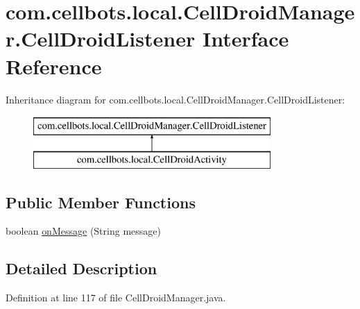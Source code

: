 \hypertarget{interfacecom_1_1cellbots_1_1local_1_1_cell_droid_manager_1_1_cell_droid_listener}{\section{com.\-cellbots.\-local.\-Cell\-Droid\-Manager.\-Cell\-Droid\-Listener Interface Reference}
\label{interfacecom_1_1cellbots_1_1local_1_1_cell_droid_manager_1_1_cell_droid_listener}
}
Inheritance diagram for com.\-cellbots.\-local.\-Cell\-Droid\-Manager.\-Cell\-Droid\-Listener\-:\begin{figure}[H]
\begin{center}
\leavevmode
\includegraphics[height=2.000000cm]{interfacecom_1_1cellbots_1_1local_1_1_cell_droid_manager_1_1_cell_droid_listener}
\end{center}
\end{figure}
\subsection*{Public Member Functions}
\begin{DoxyCompactItemize}
\item 
boolean \hyperlink{interfacecom_1_1cellbots_1_1local_1_1_cell_droid_manager_1_1_cell_droid_listener_acd28275211434068f85f6e2960574f6e}{on\-Message} (String message)
\end{DoxyCompactItemize}


\subsection{Detailed Description}


Definition at line 117 of file Cell\-Droid\-Manager.\-java.



